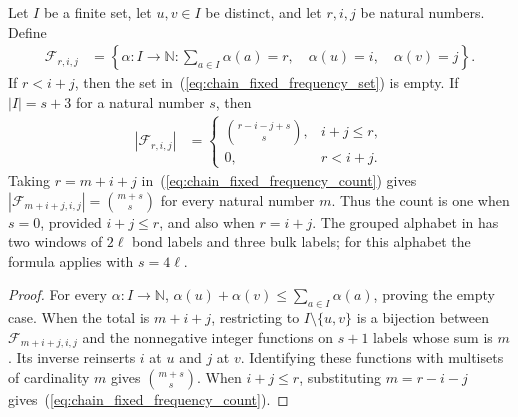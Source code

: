 \begin{lemma}
    \label{thm:chain_two_fixed_frequencies}
    \leanok
    Let $I$ be a finite set, let $u,v\in I$ be distinct, and let
    $r,i,j$ be natural numbers. Define
    \begin{align}
        \mathcal F_{r,i,j}
         & =\left\{\alpha:I\to\mathbb N:
        \sum_{a\in I}\alpha(a)=r,\quad
        \alpha(u)=i,\quad\alpha(v)=j\right\}.\label{eq:chain_fixed_frequency_set}
    \end{align}
    If $r<i+j$, then the set in~(\ref{eq:chain_fixed_frequency_set}) is empty.
    If $|I|=s+3$ for a natural number $s$, then
    \begin{align}
        |\mathcal F_{r,i,j}|
         & =\begin{cases}
                \displaystyle\binom{r-i-j+s}{s}, & i+j\le r, \\
                0,                               & r<i+j.
            \end{cases}\label{eq:chain_fixed_frequency_count}
    \end{align}
    Taking $r=m+i+j$ in~(\ref{eq:chain_fixed_frequency_count}) gives
    $|\mathcal F_{m+i+j,i,j}|=\binom{m+s}{s}$
    for every natural number $m$.
    Thus the count is one when $s=0$, provided $i+j\le r$,
    and also when $r=i+j$.
    The grouped alphabet in \cite[Section~4.1]{Arad2016RigorousRG}
    has two windows of $2\ell$ bond labels and three bulk labels;
    for this alphabet the formula applies with $s=4\ell$.
\end{lemma}
\begin{proof}\leanok
    For every $\alpha:I\to\mathbb N$,
    $\alpha(u)+\alpha(v)\le\sum_{a\in I}\alpha(a)$,
    proving the empty case.
    When the total is $m+i+j$, restricting to $I\setminus\{u,v\}$
    is a bijection between $\mathcal F_{m+i+j,i,j}$ and the
    nonnegative integer functions on $s+1$ labels whose sum is $m$.
    Its inverse reinserts $i$ at $u$ and $j$ at $v$.
    Identifying these functions with multisets of cardinality $m$
    gives $\binom{m+s}{s}$.
    When $i+j\le r$, substituting $m=r-i-j$ gives~(\ref{eq:chain_fixed_frequency_count}).
\end{proof}

